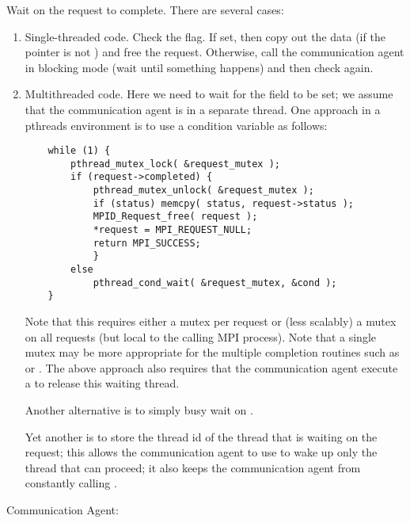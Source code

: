 \begin{mmadi}
\begin{tcp}
Wait on the request to complete.  There are several cases:
\begin{enumerate}
\item Single-threaded code.  Check the  flag.
  If set, then copy out the  data (if the 
  pointer is not ) and free the request.  Otherwise, 
  call the communication agent in blocking mode (wait until something happens)
  and then check again.

\item Multithreaded code.  Here we need to wait for the
   field to be set; we assume that the
  communication agent is in a separate thread.  One approach in a pthreads
  environment is to use a 
  condition variable as follows:
\begin{verbatim}
    while (1) {
        pthread_mutex_lock( &request_mutex );
        if (request->completed) {
            pthread_mutex_unlock( &request_mutex );
            if (status) memcpy( status, request->status );
            MPID_Request_free( request );
            *request = MPI_REQUEST_NULL;
            return MPI_SUCCESS;
            }
        else 
            pthread_cond_wait( &request_mutex, &cond );
    }
\end{verbatim}  
Note that this requires either a mutex per request or (less scalably) a mutex
on all requests (but local to the calling MPI process).  
Note that a single mutex may be more appropriate for the multiple completion
routines such as  or .
The above approach also requires that the communication agent execute a
 to release this waiting thread.

Another alternative is to simply busy wait on .

Yet another is to store the thread id of the thread that is waiting on the
request; this allows the communication agent to use 
to wake up only the thread that can proceed; it also keeps the communication
agent from constantly calling .
\end{enumerate}

Communication Agent:


\end{tcp}
\end{mmadi}
